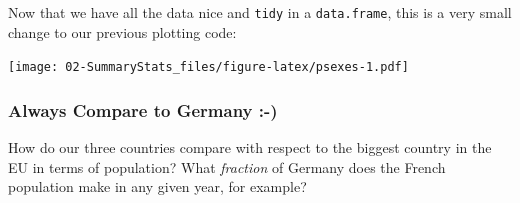 \documentclass[]{book}
\newenvironment{Shaded}{\begin{snugshade}}{\end{snugshade}}
\newcommand{\KeywordTok}[1]{\textcolor[rgb]{0.13,0.29,0.53}{\textbf{#1}}}
\newcommand{\DataTypeTok}[1]{\textcolor[rgb]{0.13,0.29,0.53}{#1}}
\newcommand{\FloatTok}[1]{\textcolor[rgb]{0.00,0.00,0.81}{#1}}
\newcommand{\StringTok}[1]{\textcolor[rgb]{0.31,0.60,0.02}{#1}}
\newcommand{\CommentTok}[1]{\textcolor[rgb]{0.56,0.35,0.01}{\textit{#1}}}
\newcommand{\OperatorTok}[1]{\textcolor[rgb]{0.81,0.36,0.00}{\textbf{#1}}}
\newcommand{\NormalTok}[1]{#1}
\begin{document}
Now that we have all the data nice and \texttt{tidy} in a
\texttt{data.frame}, this is a very small change to our previous
plotting code:

\begin{Shaded}
\end{Shaded}

\texttt{[image: 02-SummaryStats\_files/figure-latex/psexes-1.pdf]}

\subsubsection*{Always Compare to Germany
:-)}\label{always-compare-to-germany--}

How do our three countries compare with respect to the biggest country
in the EU in terms of population? What \emph{fraction} of Germany does
the French population make in any given year, for example?
\end{document}
